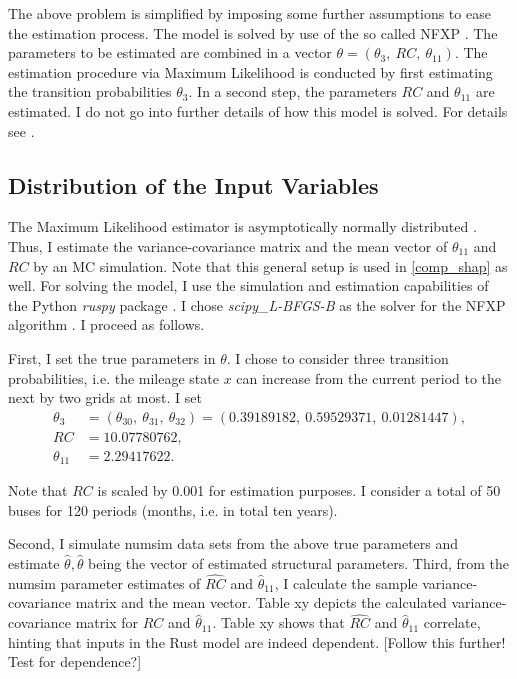 The above problem is simplified by imposing some further assumptions to ease the estimation process. The model is solved by use of the so called NFXP \citep{R87}. The parameters to be estimated are combined in a vector $\theta=(\theta_3,\ RC,\ \theta_{11}) $. The estimation procedure via Maximum Likelihood is conducted by first estimating the transition probabilities $\theta_3$. In a second step, the parameters $RC$ and $\theta_{11}$ are estimated. I do not go into further details of how this model is solved. For details see \citet{R87}.

\subsection{Distribution of the Input Variables} \label{model_setup}

The Maximum Likelihood estimator is asymptotically normally distributed \citep{R73}. Thus, I estimate the variance-covariance matrix and the mean vector of $\theta_{11}$ and $RC$ by an MC simulation. Note that this general setup is used in \cref{comp_shap} as well. For solving the model, I use the simulation and estimation capabilities of the Python \textit{ruspy} package \citep{OSE19}. I chose \textit{scipy\_L-BFGS-B} as the solver for the NFXP algorithm \citep{SP20}. I proceed as follows.

First, I set the true parameters in $\theta$. I chose to consider three transition probabilities, i.e. the mileage state $x$ can increase from the current period to the next by two grids at most. I set
\begin{align*}
\theta_3 &= (\theta_{30},\ \theta_{31},\ \theta_{32})=(0.39189182,\ 0.59529371,\ 0.01281447),\\
RC &= 10.07780762,\\
\theta_{11} &= 2.29417622.
\end{align*}

\noindent Note that $RC$ is scaled by 0.001 for estimation purposes. I consider a total of 50 buses for 120 periods (months, i.e. in total ten years).

Second, I simulate numsim data sets from the above true parameters and estimate $\hat{\theta}, \hat{\theta}$ being the vector of estimated structural parameters.
Third, from the numsim parameter estimates of $\widehat{RC}$ and ${\hat{\theta}}_{11}$, I calculate the sample variance-covariance matrix and the mean vector. Table xy depicts the calculated variance-covariance matrix for $\widehat{RC}$ and ${\hat{\theta}}_{11}$. Table xy shows that $\widehat{RC}$ and ${\hat{\theta}}_{11}$ correlate, hinting that inputs in the Rust model are indeed dependent.
[Follow this further! Test for dependence?]

